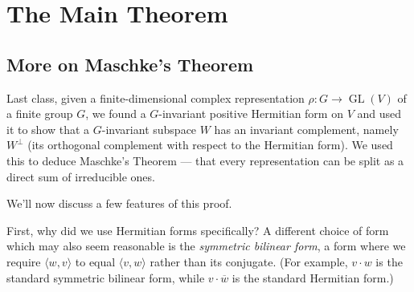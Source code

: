 





\section{The Main Theorem}

\subsection{More on Maschke's Theorem}

Last class, given a finite-dimensional complex representation $\rho: G \to \operatorname{GL}(V)$ of a finite group $G$, we found a $G$-invariant positive Hermitian form on $V$ and used it to show that a $G$-invariant subspace $W$ has an invariant complement, namely $W^\perp$ (its orthogonal complement with respect to the Hermitian form). We used this to deduce Maschke's Theorem --- that every representation can be split as a direct sum of irreducible ones. 

We'll now discuss a few features of this proof. 

First, why did we use Hermitian forms specifically? A different choice of form which may also seem reasonable is the \emph{symmetric bilinear form}, a form where we require $\langle w, v \rangle$ to equal $\langle v, w \rangle$ rather than its conjugate. (For example, $v\cdot w$ is the standard symmetric bilinear form, while $v\cdot \overline{w}$ is the standard Hermitian form.) 

